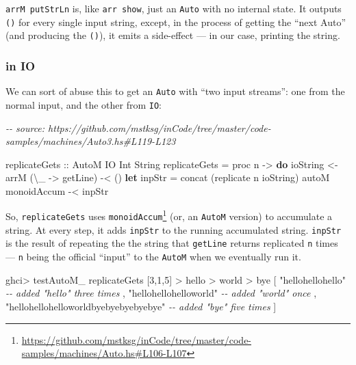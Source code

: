 \documentclass[]{article}
\newenvironment{Shaded}{}{}
\newcommand{\CommentTok}[1]{\textcolor[rgb]{0.38,0.63,0.69}{\textit{#1}}}
\newcommand{\DataTypeTok}[1]{\textcolor[rgb]{0.56,0.13,0.00}{#1}}
\newcommand{\DecValTok}[1]{\textcolor[rgb]{0.25,0.63,0.44}{#1}}
\newcommand{\FunctionTok}[1]{\textcolor[rgb]{0.02,0.16,0.49}{#1}}
\newcommand{\KeywordTok}[1]{\textcolor[rgb]{0.00,0.44,0.13}{\textbf{#1}}}
\newcommand{\NormalTok}[1]{#1}
\newcommand{\OperatorTok}[1]{\textcolor[rgb]{0.40,0.40,0.40}{#1}}
\newcommand{\OtherTok}[1]{\textcolor[rgb]{0.00,0.44,0.13}{#1}}
\newcommand{\StringTok}[1]{\textcolor[rgb]{0.25,0.44,0.63}{#1}}
\renewcommand{\href}[2]{#2\footnote{\url{#1}}}
\begin{document}
\texttt{arrM\ putStrLn} is, like \texttt{arr\ show}, just an \texttt{Auto} with
no internal state. It outputs \texttt{()} for every single input string, except,
in the process of getting the ``next Auto'' (and producing the \texttt{()}), it
emits a side-effect --- in our case, printing the string.

\subsubsection{in IO}\label{in-io}

We can sort of abuse this to get an \texttt{Auto} with ``two input streams'':
one from the normal input, and the other from \texttt{IO}:

\begin{Shaded}
\begin{Highlighting}[]
\CommentTok{{-}{-} source: https://github.com/mstksg/inCode/tree/master/code{-}samples/machines/Auto3.hs\#L119{-}L123}

\OtherTok{replicateGets ::} \DataTypeTok{AutoM} \DataTypeTok{IO} \DataTypeTok{Int} \DataTypeTok{String}
\NormalTok{replicateGets }\OtherTok{=}\NormalTok{ proc n }\OtherTok{{-}\textgreater{}} \KeywordTok{do}
\NormalTok{    ioString }\OtherTok{\textless{}{-}}\NormalTok{ arrM (\textbackslash{}\_ }\OtherTok{{-}\textgreater{}} \FunctionTok{getLine}\NormalTok{) }\OperatorTok{{-}\textless{}}\NormalTok{ ()}
    \KeywordTok{let}\NormalTok{ inpStr }\OtherTok{=} \FunctionTok{concat}\NormalTok{ (}\FunctionTok{replicate}\NormalTok{ n ioString)}
\NormalTok{    autoM monoidAccum }\OperatorTok{{-}\textless{}}\NormalTok{ inpStr}
\end{Highlighting}
\end{Shaded}

So, \texttt{replicateGets} uses
\href{https://github.com/mstksg/inCode/tree/master/code-samples/machines/Auto.hs\#L106-L107}{\texttt{monoidAccum}}
(or, an \texttt{AutoM} version) to accumulate a string. At every step, it adds
\texttt{inpStr} to the running accumulated string. \texttt{inpStr} is the result
of repeating the the string that \texttt{getLine} returns replicated \texttt{n}
times --- \texttt{n} being the official ``input'' to the \texttt{AutoM} when we
eventually run it.

\begin{Shaded}
\begin{Highlighting}[]
\NormalTok{ghci}\OperatorTok{\textgreater{}}\NormalTok{ testAutoM\_ replicateGets [}\DecValTok{3}\NormalTok{,}\DecValTok{1}\NormalTok{,}\DecValTok{5}\NormalTok{]}
\OperatorTok{\textgreater{}}\NormalTok{ hello}
\OperatorTok{\textgreater{}}\NormalTok{ world}
\OperatorTok{\textgreater{}}\NormalTok{ bye}
\NormalTok{[ }\StringTok{"hellohellohello"}         \CommentTok{{-}{-} added "hello" three times}
\NormalTok{, }\StringTok{"hellohellohelloworld"}    \CommentTok{{-}{-} added "world" once}
\NormalTok{, }\StringTok{"hellohellohelloworldbyebyebyebyebye"}     \CommentTok{{-}{-} added "bye" five times}
\NormalTok{]}
\end{Highlighting}
\end{Shaded}
\end{document}
